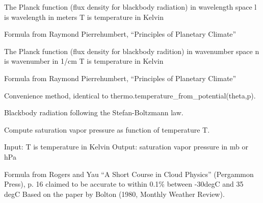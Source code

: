 \documentclass[letterpaper,10pt,english]{sphinxmanual}
\begin{document}
\begin{fulllineitems}
\label{api/climlab.utils:climlab.utils.thermo.Planck_wavelength}
The Planck function (flux density for blackbody radiation)
in wavelength space
l is wavelength in meters
T is temperature in Kelvin

Formula from Raymond Pierrehumbert, ``Principles of Planetary Climate''

\end{fulllineitems}


\begin{fulllineitems}
\label{api/climlab.utils:climlab.utils.thermo.Planck_wavenumber}
The Planck function (flux density for blackbody radition)
in wavenumber space
n is wavenumber in 1/cm
T is temperature in Kelvin

Formula from Raymond Pierrehumbert, ``Principles of Planetary Climate''

\end{fulllineitems}


\begin{fulllineitems}
\label{api/climlab.utils:climlab.utils.thermo.T}
Convenience method, identical to thermo.temperature\_from\_potential(theta,p).

\end{fulllineitems}


\begin{fulllineitems}
\label{api/climlab.utils:climlab.utils.thermo.blackbody_emission}
Blackbody radiation following the Stefan-Boltzmann law.

\end{fulllineitems}


\begin{fulllineitems}
\label{api/climlab.utils:climlab.utils.thermo.clausius_clapeyron}
Compute saturation vapor pressure as function of temperature T.

Input: T is temperature in Kelvin
Output: saturation vapor pressure in mb or hPa

Formula from Rogers and Yau ``A Short Course in Cloud Physics'' (Pergammon Press), p. 16
claimed to be accurate to within 0.1\% between -30degC and 35 degC
Based on the paper by Bolton (1980, Monthly Weather Review).

\end{fulllineitems}
\end{document}
